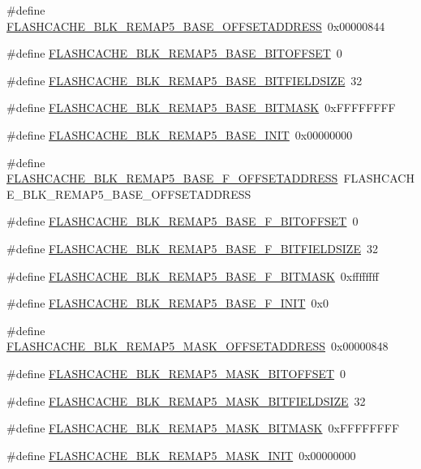 \begin{DoxyCompactItemize}
\item 
\#define \hyperlink{a00550_a84137c105c5620532d8e48c3111848fb}{FLASHCACHE\_\-BLK\_\-REMAP5\_\-BASE\_\-OFFSETADDRESS}~0x00000844
\item 
\#define \hyperlink{a00550_a63a597887f4fc505d0b1abd78d25beb2}{FLASHCACHE\_\-BLK\_\-REMAP5\_\-BASE\_\-BITOFFSET}~0
\item 
\#define \hyperlink{a00550_a27ce3d2674e4767527418b0c8369bdb8}{FLASHCACHE\_\-BLK\_\-REMAP5\_\-BASE\_\-BITFIELDSIZE}~32
\item 
\#define \hyperlink{a00550_ae24044bdae453822b537c880538b7d17}{FLASHCACHE\_\-BLK\_\-REMAP5\_\-BASE\_\-BITMASK}~0xFFFFFFFF
\item 
\#define \hyperlink{a00550_a592ab5cff920f244d189e822ba3b1bc1}{FLASHCACHE\_\-BLK\_\-REMAP5\_\-BASE\_\-INIT}~0x00000000
\item 
\#define \hyperlink{a00550_ab2edbfe5832eecb3db6752c01f793d2e}{FLASHCACHE\_\-BLK\_\-REMAP5\_\-BASE\_\-F\_\-OFFSETADDRESS}~FLASHCACHE\_\-BLK\_\-REMAP5\_\-BASE\_\-OFFSETADDRESS
\item 
\#define \hyperlink{a00550_abb8ec2844e45245b618d1096e17f3e0f}{FLASHCACHE\_\-BLK\_\-REMAP5\_\-BASE\_\-F\_\-BITOFFSET}~0
\item 
\#define \hyperlink{a00550_aefb82fffc3758b30d4d91ce937c41581}{FLASHCACHE\_\-BLK\_\-REMAP5\_\-BASE\_\-F\_\-BITFIELDSIZE}~32
\item 
\#define \hyperlink{a00550_ad49893ee5c2e82a9f6f7b0ccc3cca914}{FLASHCACHE\_\-BLK\_\-REMAP5\_\-BASE\_\-F\_\-BITMASK}~0xffffffff
\item 
\#define \hyperlink{a00550_a203742fc8bbe79360f56470b379cd07d}{FLASHCACHE\_\-BLK\_\-REMAP5\_\-BASE\_\-F\_\-INIT}~0x0
\item 
\#define \hyperlink{a00550_a84d325afafad2416453c248f72688a6e}{FLASHCACHE\_\-BLK\_\-REMAP5\_\-MASK\_\-OFFSETADDRESS}~0x00000848
\item 
\#define \hyperlink{a00550_a4a795e75725e4398caece4b24540a150}{FLASHCACHE\_\-BLK\_\-REMAP5\_\-MASK\_\-BITOFFSET}~0
\item 
\#define \hyperlink{a00550_a4314c9160e4c8c998dc52cab2a6b54a6}{FLASHCACHE\_\-BLK\_\-REMAP5\_\-MASK\_\-BITFIELDSIZE}~32
\item 
\#define \hyperlink{a00550_a23bd069f6d9a6fdd73fef0cce5aa8de0}{FLASHCACHE\_\-BLK\_\-REMAP5\_\-MASK\_\-BITMASK}~0xFFFFFFFF
\item 
\#define \hyperlink{a00550_ac9b548aa264b21adfaf2ffaf1aa800a9}{FLASHCACHE\_\-BLK\_\-REMAP5\_\-MASK\_\-INIT}~0x00000000
\item 

\end{DoxyCompactItemize}
